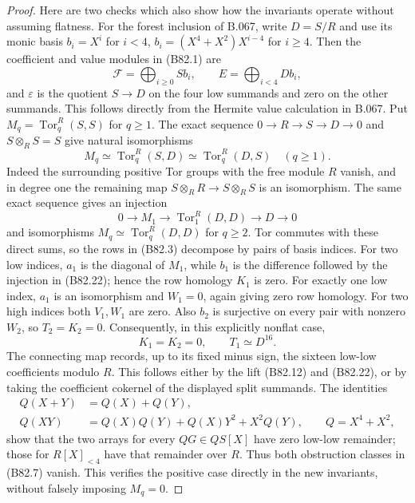 \begin{proof}
Here are two checks which also show how the invariants operate
without assuming flatness. For the forest inclusion of B.067,
write $D=S/R$ and use its monic basis
$b_i=X^i$ for $i<4$, $b_i=(X^4+X^2)X^{i-4}$ for $i\ge4$.
Then the coefficient and value modules in (B82.1) are
\[
 \mathcal F=\bigoplus_{i\ge0}S b_i,\qquad
 E=\bigoplus_{i<4}D b_i,
                                                        \tag{B82.20}
\]
and $\varepsilon$ is the quotient $S\to D$ on the four low
summands and zero on the other summands. This follows directly
from the Hermite value calculation in B.067. Put
$M_q=\operatorname{Tor}_q^R(S,S)$ for $q\ge1$.
The exact sequence $0\to R\to S\to D\to0$ and
$S\otimes_RS=S$ give natural isomorphisms
\[
 M_q\simeq\operatorname{Tor}_q^R(S,D)
     \simeq\operatorname{Tor}_q^R(D,S)\quad(q\ge1).
                                                        \tag{B82.21}
\]
Indeed the surrounding positive Tor groups with the free module
$R$ vanish, and in degree one the remaining map
$S\otimes_RR\to S\otimes_RS$ is an isomorphism. The same
exact sequence gives an injection
\[
 0\longrightarrow M_1\longrightarrow
 \operatorname{Tor}_1^R(D,D)\longrightarrow D\longrightarrow0
                                                        \tag{B82.22}
\]
and isomorphisms $M_q\simeq\operatorname{Tor}_q^R(D,D)$
for $q\ge2$. Tor commutes with these direct sums, so the rows
in (B82.3) decompose by pairs of basis indices. For two low
indices, $a_1$ is the diagonal of $M_1$, while $b_1$ is the
difference followed by the injection in (B82.22); hence the
row homology $K_1$ is zero. For exactly one low index, $a_1$
is an isomorphism and $W_1=0$, again giving zero row homology.
For two high indices both $V_1,W_1$ are zero. Also $b_2$ is
surjective on every pair with nonzero $W_2$, so $T_2=K_2=0$.
Consequently, in this explicitly nonflat case,
\[
                  K_1=K_2=0,\qquad T_1\simeq D^{16}.
                                                        \tag{B82.23}
\]
The connecting map records, up to its fixed minus sign, the
sixteen low-low coefficients modulo $R$. This follows either
by the lift (B82.12) and (B82.22), or by taking the coefficient
cokernel of the displayed split summands. The identities
\[
\begin{aligned}
 Q(X+Y)&=Q(X)+Q(Y),\\
 Q(XY)&=Q(X)Q(Y)+Q(X)Y^2+X^2Q(Y),\qquad Q=X^4+X^2,
\end{aligned}
\]
show that the two arrays for every $QG\in Q S[X]$ have zero
low-low remainder; those for $R[X]_{<4}$ have that remainder
over $R$. Thus both obstruction classes in (B82.7) vanish.
This verifies the positive case directly in the new invariants,
without falsely imposing $M_q=0$.


\end{proof}
